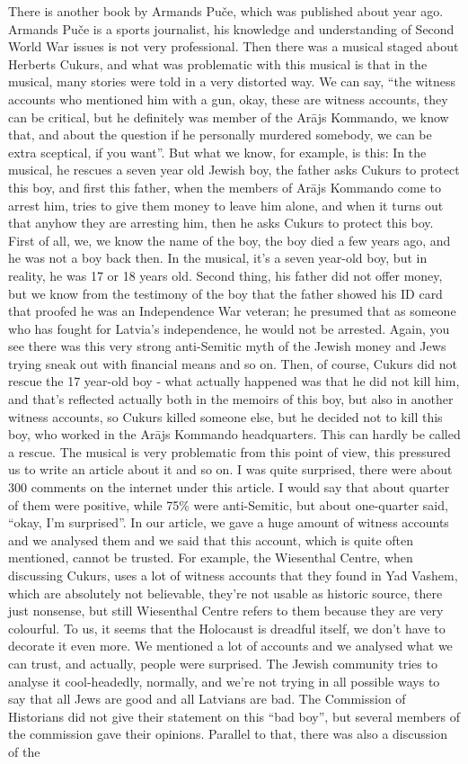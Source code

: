 There is another book by Armands Puče, which was published about year ago. Armands Puče is a sports journalist, his knowledge and understanding of Second World War issues is not very professional. Then there was a musical staged about Herberts Cukurs, and what was problematic with this musical is that in the musical, many stories were told in a very distorted way. We can say, ``the witness accounts who mentioned him with a gun, okay, these are witness accounts, they can be critical, but he definitely was member of the Arājs Kommando, we know that, and about the question if he personally murdered somebody, we can be extra sceptical, if you want''. But what we know, for example, is this: In the musical, he rescues a seven year old Jewish boy, the father asks Cukurs to protect this boy, and first this father, when the members of Arājs Kommando come to arrest him, tries to give them money to leave him alone, and when it turns out that anyhow they are arresting him, then he asks Cukurs to protect this boy. First of all, we, we know the name of the boy, the boy died a few years ago, and he was not a boy back then. In the musical, it's a seven year-old boy, but in reality, he was 17 or 18 years old. Second thing, his father did not offer money, but we know from the testimony of the boy that the father showed his ID card that proofed he was an Independence War veteran; he presumed that as someone who has fought for Latvia's independence, he would not be arrested. Again, you see there was this very strong anti-Semitic myth of the Jewish money and Jews trying sneak out with financial means and so on. Then, of course, Cukurs did not rescue the 17 year-old boy - what actually happened was that he did not kill him, and that’s reflected actually both in the memoirs of this boy, but also in another witness accounts, so Cukurs killed someone else, but he decided not to kill this boy, who worked in the Arājs Kommando headquarters. This can hardly be called a rescue. The musical is very problematic from this point of view, this pressured us to write an article about it and so on. I was quite surprised, there were about 300 comments on the internet under this article. I would say that about quarter of them were positive, while 75\% were anti-Semitic, but about one-quarter said, ``okay, I'm surprised''. In our article, we gave a huge amount of witness accounts and we analysed them and we said that this account, which is quite often mentioned, cannot be trusted. For example, the Wiesenthal Centre, when discussing Cukurs, uses a lot of witness accounts that they found in Yad Vashem, which are absolutely not believable, they're not usable as historic source, there just nonsense, but still Wiesenthal Centre refers to them because they are very colourful. To us, it seems that the Holocaust is dreadful itself, we don't have to decorate it even more. We mentioned a lot of accounts and we analysed what we can trust, and actually, people were surprised. The Jewish community tries to analyse it cool-headedly, normally, and we're not trying in all possible ways to say that all Jews are good and all Latvians are bad. The Commission of Historians did not give their  statement on this ``bad boy'', but several members of the commission gave their opinions. Parallel to that, there was also a discussion of the 